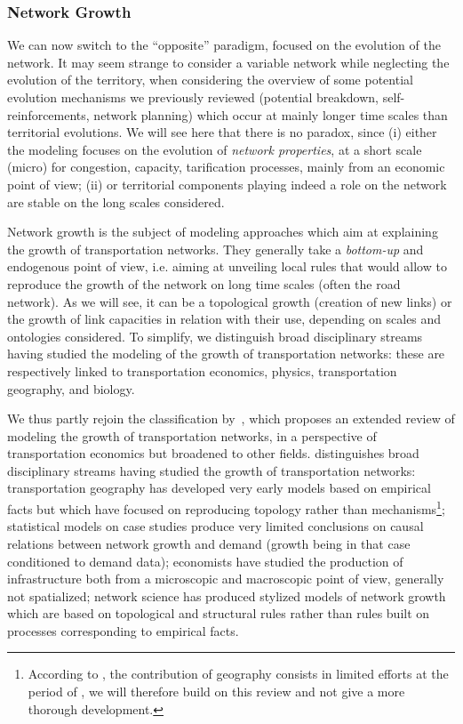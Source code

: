 \documentclass[galley]{jtlu-article-2col}
\begin{document}
\subsubsection{Network Growth}

We can now switch to the ``opposite'' paradigm, focused on the evolution of the network. It may seem strange to consider a variable network while neglecting the evolution of the territory, when considering the overview of some potential evolution mechanisms we previously reviewed (potential breakdown, self-reinforcements, network planning) which occur at mainly longer time scales than territorial evolutions. We will see here that there is no paradox, since (i) either the modeling focuses on the evolution of \emph{network properties}, at a short scale (micro) for congestion, capacity, tarification processes, mainly from an economic point of view; (ii) or territorial components playing indeed a role on the network are stable on the long scales considered.

Network growth is the subject of modeling approaches which aim at explaining the growth of transportation networks. They generally take a \emph{bottom-up} and endogenous point of view, i.e. aiming at unveiling local rules that would allow to reproduce the growth of the network on long time scales (often the road network). As we will see, it can be a topological growth (creation of new links) or the growth of link capacities in relation with their use, depending on scales and ontologies considered. To simplify, we distinguish broad disciplinary streams having studied the modeling of the growth of transportation networks: these are respectively linked to transportation economics, physics, transportation geography, and biology.

We thus partly rejoin the classification by~\cite{xie2009modeling}, which proposes an extended review of modeling the growth of transportation networks, in a perspective of transportation economics but broadened to other fields. \cite{xie2009modeling} distinguishes broad disciplinary streams having studied the growth of transportation networks: transportation geography has developed very early models based on empirical facts but which have focused on reproducing topology rather than mechanisms\footnote{According to \cite{xie2009modeling}, the contribution of geography consists in limited efforts at the period of \cite{haggett1970network}, we will therefore build on this review and not give a more thorough development.}; statistical models on case studies produce very limited conclusions on causal relations between network growth and demand (growth being in that case conditioned to demand data); economists have studied the production of infrastructure both from a microscopic and macroscopic point of view, generally not spatialized; network science has produced stylized models of network growth which are based on topological and structural rules rather than rules built on processes corresponding to empirical facts.
\end{document}
